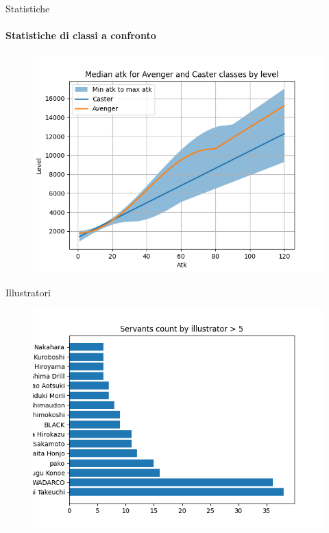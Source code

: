 \documentclass{beamer}
\begin{document}
\begin{darkframes}
  \begin{frame}{Statistiche}
    \framesubtitle{Statistiche di classi a confronto}
    \begin{figure}
      \centering
      \includegraphics[scale=0.55]{./images/caster_vs_avenger.png}
    \end{figure}
  \end{frame}

  \begin{frame}{Illustratori}
    \begin{figure}
      \centering
      \includegraphics[scale=0.55]{./images/illustrators.png}
    \end{figure}
  \end{frame}


\end{darkframes}
\end{document}
